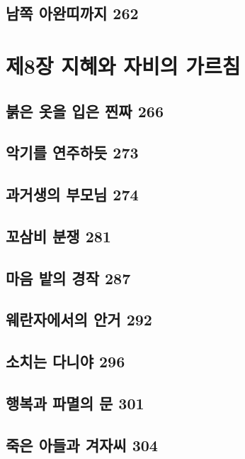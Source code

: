 \documentclass[12pt, a4paper, oneside]{book}
\let\stdsection\section
\renewcommand\section{\newpage\stdsection}
\begin{document}
	\section{남쪽 아완띠까지 262}



	\chapter{제8장 지혜와 자비의 가르침}
	\noptcrule
	\parttoc				


	\section{붉은 옷을 입은 찐짜 266 }

	\section{악기를 연주하듯 273 }

	\section{과거생의 부모님 274 }

	\section{꼬삼비 분쟁 281 }

	\section{마음 밭의 경작 287 }

	\section{웨란자에서의 안거 292 }

	\section{소치는 다니야 296 }

	\section{행복과 파멸의 문 301 }

	\section{죽은 아들과 겨자씨 304}
\end{document}
